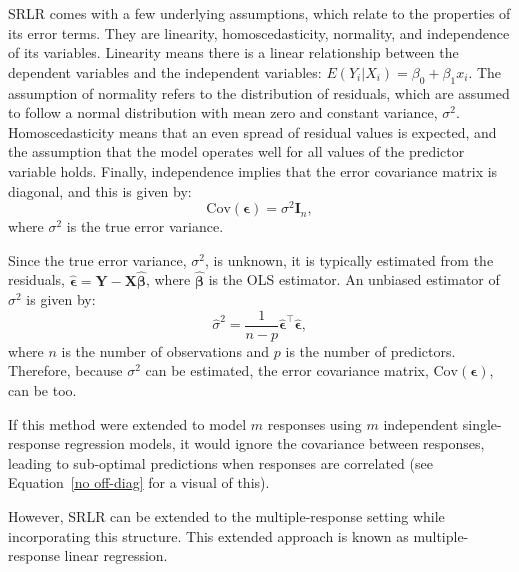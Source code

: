 \documentclass[11pt]{report} %
\begin{document}
SRLR comes with a few underlying assumptions, which relate to the properties of its error terms. They are linearity, homoscedasticity, normality, and independence of its variables. Linearity means there is a linear relationship between the dependent variables and the independent variables: \( E(Y_i | X_i) = \beta_0 + \beta_1 x_i \). The assumption of normality refers to the distribution of residuals, which are assumed to follow a normal distribution with mean zero and constant variance, $\sigma^2$. Homoscedasticity means that an even spread of residual values is expected, and the assumption that the model operates well for all values of the predictor variable holds. Finally, independence implies that the error covariance matrix is diagonal, and this is given by:
\begin{equation*}
    \text{Cov}(\boldsymbol{\epsilon}) = \sigma^2 \mathbf{I}_n,
\end{equation*}
where $\sigma^2$ is the true error variance. 

Since the true error variance, \( \sigma^2 \), is unknown, it is typically estimated from the residuals, 
\( \hat{\boldsymbol{\epsilon}} = \mathbf{Y} - \mathbf{X} \hat{\boldsymbol{\beta}} \), 
where \( \hat{\boldsymbol{\beta}} \) is the OLS estimator. An unbiased estimator of \( \sigma^2 \) is given by:
\begin{equation}
\hat{\sigma}^2 = \frac{1}{n - p} \hat{\boldsymbol{\epsilon}}^\top \hat{\boldsymbol{\epsilon}},
\label{unbiased}
\end{equation}
where $n$ is the number of observations and $p$ is the number of predictors. Therefore, because $\sigma^2$ can be estimated, the error covariance matrix, $\text{Cov}(\boldsymbol{\epsilon})$, can be too.

If this method were extended to model $m$ responses using $m$ independent single-response regression models, it would ignore the covariance between responses, leading to sub-optimal predictions when responses are correlated (see Equation~\ref{no off-diag} for a visual of this). 

However, SRLR can be extended to the multiple-response setting while incorporating this structure. This extended approach is known as multiple-response linear regression.
\end{document}
